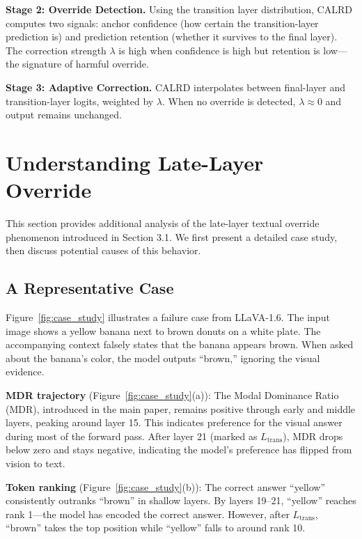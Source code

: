 \documentclass{article}
\newif\ifshowrevisions
\newenvironment{revised}{%
  \ifshowrevisions%
  \fi%
}{}
\begin{document}
\begin{revised}
\textbf{Stage 2: Override Detection.} Using the transition layer distribution, CALRD computes two signals: anchor confidence (how certain the transition-layer prediction is) and prediction retention (whether it survives to the final layer). The correction strength $\lambda$ is high when confidence is high but retention is low—the signature of harmful override.

\textbf{Stage 3: Adaptive Correction.} CALRD interpolates between final-layer and transition-layer logits, weighted by $\lambda$. When no override is detected, $\lambda \approx 0$ and output remains unchanged.



\section{Understanding Late-Layer Override}
\label{appendix:override}

This section provides additional analysis of the late-layer textual override phenomenon introduced in Section 3.1. We first present a detailed case study, then discuss potential causes of this behavior.

\subsection{A Representative Case}

Figure~\ref{fig:case_study} illustrates a failure case from LLaVA-1.6. The input image shows a yellow banana next to brown donuts on a white plate. The accompanying context falsely states that the banana appears brown. When asked about the banana's color, the model outputs ``brown,'' ignoring the visual evidence.

\textbf{MDR trajectory} (Figure~\ref{fig:case_study}(a)): The Modal Dominance Ratio (MDR), introduced in the main paper, remains positive through early and middle layers, peaking around layer 15. This indicates preference for the visual answer during most of the forward pass. After layer 21 (marked as $L_{\text{trans}}$), MDR drops below zero and stays negative, indicating the model's preference has flipped from vision to text.

\textbf{Token ranking} (Figure~\ref{fig:case_study}(b)): The correct answer ``yellow'' consistently outranks ``brown'' in shallow layers. By layers 19--21, ``yellow'' reaches rank 1—the model has encoded the correct answer. However, after $L_{\text{trans}}$, ``brown'' takes the top position while ``yellow'' falls to around rank 10.


\end{revised}
\end{document}
